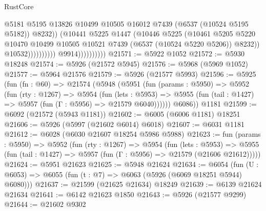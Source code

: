\begin{lexlean}{RustCore}
\begin{coremodule}
                                              @5181
                                              @5195
                                              @13826
                                              @10499
                                              @10505
                                              @16012
                                              @7439
                                              (@6537 (@10524 @5195 @5182))
                                              @8232))
                                          (@10441
                                            @5225
                                            @1447
                                            (@10446
                                              @5225
                                              (@10461
                                                @5205
                                                @5220
                                                @10470
                                                @10499
                                                @10505
                                                @10521
                                                @7439
                                                (@6537 (@10524 @5220 @5206))
                                                @8232))
                                            @10532))))))))))
                        @9914))))))))))
@21571 := @5922 @1052
@21572 := @5930 @18248
@21574 := @5926 (@21572 @5945)
@21576 := @5968 (@5969 @1052)
@21577 := @5964 @21576
@21579 := @5926 (@21577 @5993)
@21596 := @5925
    (fun (fn : @60) =>
    @21574
      (@5948
        (@5951
          (fun (params : @5950) =>
          @5952
            (fun (rty : @1267) =>
            @5954
              (fun (lets : @5953) =>
              @5955 (fun (tail : @1427) => @5957 (fun (Γ : @5956) => @21579 @6040))))))
        @6086))
    @1181
@21599 := @6092 (@21572 (@5943 @1181))
@21602 := @6005 (@6006 @1181) @18251
@21606 := @5926 (@5997 (@21602 @6014) @6018)
@21607 := @6031 @1181
@21612 := @6028 (@6030 @21607 @18254 @5986 @5988)
@21623 := fun (params : @5950) =>
  @5952
    (fun (rty : @1267) =>
    @5954
      (fun (lets : @5953) =>
      @5955 (fun (tail : @1427) => @5957 (fun (Γ : @5956) => @21579 (@21606 @21612)))))
@21624 := @5951 @21623
@21625 := @5948 @21624
@21634 := @6054
    (fun (U : @6053) => @6055 (fun (t : @7) => @6063 (@5926 (@6069 @18251 @5944) @6080)))
@21637 := @21599 (@21625 @21634) @18249
@21639 := @6139 @21624 @21634
@21641 := @6142 @21623 @1850
@21643 := @5926 (@21577 @9299)
@21644 := @21602 @9302

\end{coremodule}
\end{lexlean}
